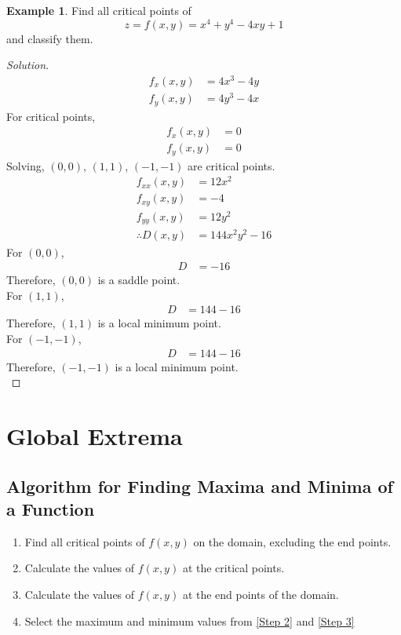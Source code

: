 \documentclass[fleqn, a4paper, 12pt]{article}
\theoremstyle{definition}
\newtheorem{example}{Example}
\theoremstyle{theorem}
\theoremstyle{remark}
\newenvironment{solution}
{\begin{proof}[Solution]\let\qed\relax}
	{\end{proof}}
\begin{document}
\begin{example}
	Find all critical points of 
	\begin{equation*}
		z = f(x,y) = x^4 + y^4 - 4xy + 1
	\end{equation*}
	and classify them.
\end{example}

\begin{solution}
	\begin{align*}
		f_x(x,y) &= 4x^3 - 4y\\
		f_y(x,y) &= 4y^3 - 4x
	\end{align*}
	For critical points,
	\begin{align*}
		f_x(x,y) &= 0\\
		f_y(x,y) &= 0
	\end{align*}
	Solving, $(0,0)$, $(1,1)$, $(-1,-1)$ are critical points.
	\begin{align*}
		f_{xx}(x,y) &= 12x^2\\
		f_{xy}(x,y) &= -4\\
		f_{yy}(x,y) &= 12y^2\\
		\therefore D(x,y) &= 144 x^2 y^2 - 16
	\end{align*}
	For $(0,0)$,
	\begin{align*}
		D &= -16
	\end{align*}
	Therefore, $(0,0)$ is a saddle point.\\
	For $(1,1)$,
	\begin{align*}
		D &= 144-16
	\end{align*}
	Therefore, $(1,1)$ is a local minimum point.\\
	For $(-1,-1)$,
	\begin{align*}
		D &= 144-16
	\end{align*}
	Therefore, $(-1,-1)$ is a local minimum point.\\
\end{solution}

\section{Global Extrema}

\subsection{Algorithm for Finding Maxima and Minima of a Function}

\begin{enumerate}[label = Step \arabic*]
	\item Find all critical points of $f(x,y)$ on the domain, excluding the end points. \label{Step 1}
	\item Calculate the values of $f(x,y)$ at the critical points. \label{Step 2}
	\item Calculate the values of $f(x,y)$ at the end points of the domain. \label{Step 3}
	\item Select the maximum and minimum values from \ref{Step 2} and \ref{Step 3}
\end{enumerate}
\end{document}
